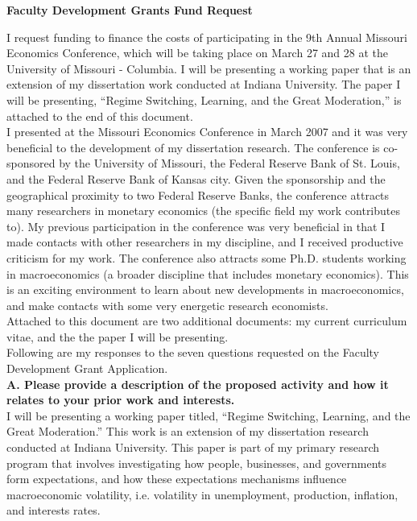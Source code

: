 \documentclass[12pt]{article}
\begin{document}
\thispagestyle{empty}
\begin{center}\textbf{Faculty Development Grants Fund Request}\end{center}

I request funding to finance the costs of participating in the 9th Annual Missouri Economics Conference, which will be taking place on March 27 and 28 at the University of Missouri - Columbia.  I will be presenting a working paper that is an extension of my dissertation work conducted at Indiana University.  The paper I will be presenting, ``Regime Switching, Learning, and the Great Moderation,'' is attached to the end of this document. \\

I presented at the Missouri Economics Conference in March 2007 and it was very beneficial to the development of my dissertation research.  The conference is co-sponsored by the University of Missouri, the Federal Reserve Bank of St. Louis, and the Federal Reserve Bank of Kansas city.  Given the sponsorship and the geographical proximity to two Federal Reserve Banks, the conference attracts many researchers in monetary economics (the specific field my work contributes to).  My previous participation in the conference was very beneficial in that I made contacts with other researchers in my discipline, and I received productive criticism for my work.  The conference also attracts some Ph.D. students working in macroeconomics (a broader discipline that includes monetary economics).  This is an exciting environment to learn about new developments in macroeconomics, and make contacts with some very energetic research economists. \\

Attached to this document are two additional documents: my current curriculum vitae, and the the paper I will be presenting.\\

Following are my responses to the seven questions requested on the Faculty Development Grant Application. \\

\textbf{A. Please provide a description of the proposed activity and how it relates to your prior work and interests.} \\

I will be presenting a working paper titled, ``Regime Switching, Learning, and the Great Moderation.''  This work is an extension of my dissertation research conducted at Indiana University.  This paper is part of my primary research program that involves investigating how people, businesses, and governments form expectations, and how these expectations mechanisms influence macroeconomic volatility, i.e. volatility in unemployment, production, inflation, and interests rates.  \\
\end{document}
